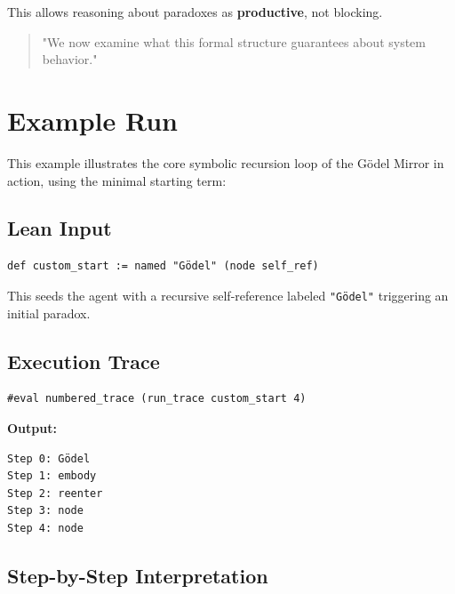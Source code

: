 \documentclass[manuscript,nonacm]{acmart}
\begin{document}
This allows reasoning about paradoxes as \textbf{productive}, not blocking.

\begin{quote}
"We now examine what this formal structure guarantees about system behavior."
\end{quote}

\section{Example Run}

This example illustrates the core symbolic recursion loop of the Gödel Mirror in action, using the minimal starting term:

\subsection{Lean Input}

\begin{verbatim}
def custom_start := named "Gödel" (node self_ref)
\end{verbatim}

This seeds the agent with a recursive self-reference labeled \texttt{"Gödel"} triggering an initial paradox.

\subsection{Execution Trace}

\begin{verbatim}
#eval numbered_trace (run_trace custom_start 4)
\end{verbatim}

\textbf{Output:}

\begin{verbatim}
Step 0: Gödel
Step 1: embody
Step 2: reenter
Step 3: node
Step 4: node
\end{verbatim}

\subsection{Step-by-Step Interpretation}
\end{document}
